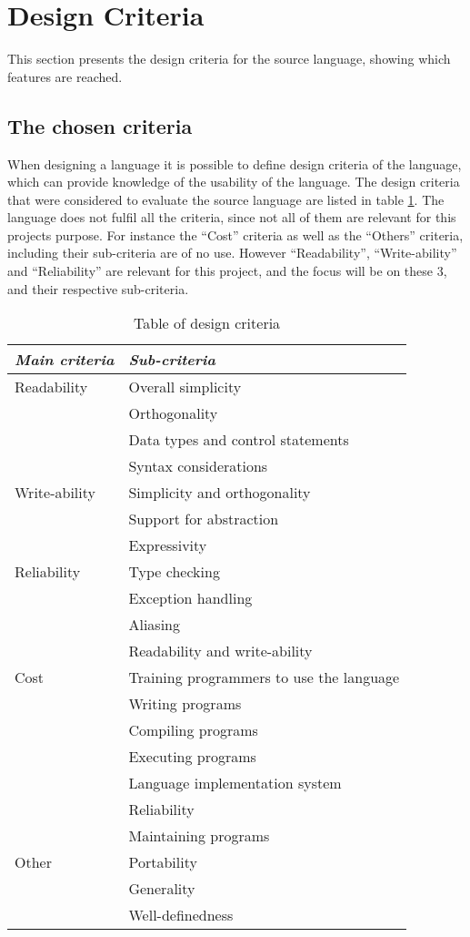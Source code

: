 \chapter{Design Criteria}\label{chap:design-criteria}
This section presents the design criteria for the source language, showing which features are reached. 

\section{The chosen criteria}
When designing a language it is possible to define design criteria of the language, which can provide knowledge of the usability of the language. The design criteria that were considered to evaluate the source language are listed in table \ref{chap:design-criteria}. The language does not fulfil all the criteria, since not all of them are relevant for this projects purpose. For instance the ``Cost'' criteria as well as the ``Others'' criteria, including their sub-criteria are of no use. However ``Readability'', ``Write-ability'' and ``Reliability'' are relevant for this project, and the focus will be on these 3, and their respective sub-criteria.

\begin{table}[H]
	\center
	\begin{tabular}{|l|l|}
	\hline
	\emph{Main criteria} & \emph{Sub-criteria} \\ 
 		\hline
 		Readability & Overall simplicity \\
 		 & Orthogonality \\
 		 & Data types and control statements \\
 		 & Syntax considerations \\
 		\hline
 		Write-ability & Simplicity and orthogonality  \\
 		 & Support for abstraction \\
 		 & Expressivity \\
 		\hline
 		Reliability & Type checking \\
 		 & Exception handling \\
 		 & Aliasing \\
 		 & Readability and write-ability \\
 		\hline
 		Cost & Training programmers to use the language \\
 		 & Writing programs \\
 		 & Compiling programs \\
 		 & Executing programs \\
 		 & Language implementation system \\
 		 & Reliability \\
 		 & Maintaining programs \\
 		\hline
 		Other & Portability \\
 		 & Generality \\
 		 & Well-definedness \\
 		\hline
	\end{tabular}
	\label{tab:design}
	\caption{Table of design criteria}
\end{table} 

